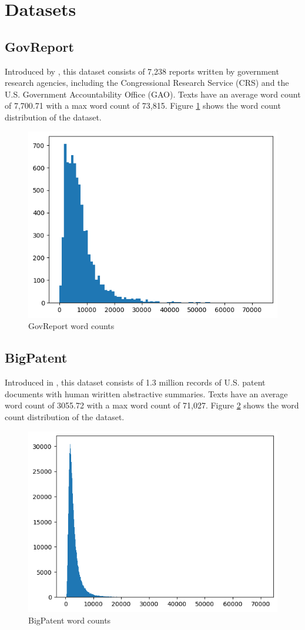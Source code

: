 \section{Datasets}
\label{sec:datasets}

\subsection*{GovReport}

Introduced by \citet{huang-etal-2021-efficient}, this dataset consists of 7,238 reports
written by government research agencies, including the Congressional Research Service (CRS)
and the U.S. Government Accountability Office (GAO).
Texts have an average word count of 7,700.71 with a max word count of 73,815.
Figure \ref{fig:govreport} shows the word count distribution of the dataset.

\begin{figure}[!ht]
	\centering
	\includegraphics[width=.48\textwidth]{Images/govreport-wordcount.png}
	\caption{GovReport word counts}
	\label{fig:govreport}
\end{figure}


\subsection*{BigPatent}

Introduced in \citet{sharma-etal-2019-bigpatent}, this dataset consists of 1.3 million
records of U.S. patent documents with human wiritten abstractive summaries.
Texts have an average word count of 3055.72 with a max word count of 71,027.
Figure \ref{fig:bigpatent} shows the word count distribution of the dataset.

\begin{figure}[!ht]
	\centering
	\includegraphics[width=.48\textwidth]{Images/bigpatent-wordcount.png}
	\caption{BigPatent word counts}
	\label{fig:bigpatent}
\end{figure}
